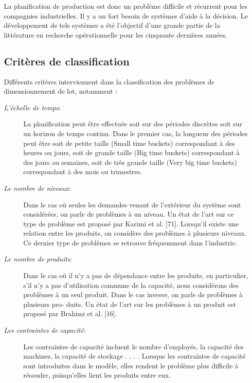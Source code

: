 \documentclass[12pt,a4paper]{article}
\begin{document}
 La planification de production est donc un problème difficile et récurrent pour les compagnies industrielles. Il y a un fort besoin de systèmes d'aide à la décision. Le développement de tels systèmes a été l'objectif d'une grande partie de la littérature en recherche opérationnelle pour les cinquante dernières années. 
	
\subsection{Critères de classification}

Différents critères interviennent dans la classification des problèmes de dimensionnement de lot, notamment : 
\begin{description}
	\item[\textsl{L'échelle de temps}:] La planification peut être effectuée soit sur des périodes discrètes soit sur un
horizon de temps continu. Dans le premier cas, la longueur des périodes peut
être soit de petite taille (Small time buckets) correspondant à des heures ou
jours, soit de grande taille (Big time buckets) correspondant à des jours ou
semaines, soit de très grande taille (Very big time buckets) correspondant à
des mois ou trimestres.

	\item[\textsl{Le nombre de niveaux}:] Dans le cas où seules les demandes venant de l'extérieur du système sont considérées, on parle de problèmes à un niveau. Un état de l'art sur ce type de problème est proposé par Karimi et al. [71]. Lorsqu'il existe une relation entre
les produits, on considère des problèmes à plusieurs niveaux. Ce dernier type
de problèmes se retrouve fréquemment dans l'industrie.

	\item[\textsl{Le nombre de produits}:] Dans le cas où il n'y a pas de dépendance entre les produits, en particulier, s'il n'y a pas d'utilisation commune de la capacité, nous considérons des problèmes
à un seul produit. Dans le cas inverse, on parle de problèmes à plusieurs pro-
duits. Un état de l'art sur les problèmes à un produit est proposé par Brahimi
et al. [16].

	\item[\textsl{Les contraintes de capacité}:] Les contraintes de capacité incluent le nombre d'employés, la capacité des machines, la capacité de stockage . . . . Lorsque les contraintes de capacité sont
introduites dans le modèle, elles rendent le problème plus difficile à résoudre,
puisqu'elles lient les produits entre eux.


\end{description}
\end{document}

